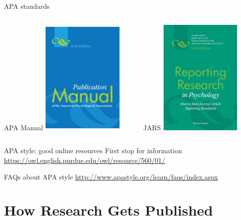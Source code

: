 \documentclass{beamer}
\begin{document}
% 
\begin{frame}{APA standards}
	\begin{columns}[T]
		\begin{column}{.5\textwidth}
			\begin{block}{APA Manual} 
			\includegraphics[width=4cm, height=5.72cm]{images/APAmanual.png}
			\end{block}
		\end{column}
		
		\begin{column}{.5\textwidth}
			\begin{block}{JARS} 
			\includegraphics[width=4cm, height=5.72cm]{images/APArep_res.png}
			\end{block}
		\end{column}
	\end{columns}
\end{frame}

% 
\begin{frame}{APA style: good online resources}
\alert{First stop for information} \url{https://owl.english.purdue.edu/owl/resource/560/01/} 

\vspace{3mm}

\alert{FAQs about APA style} \url{http://www.apastyle.org/learn/faqs/index.aspx}
\end{frame}

\section*{How Research Gets Published}
\end{document}
